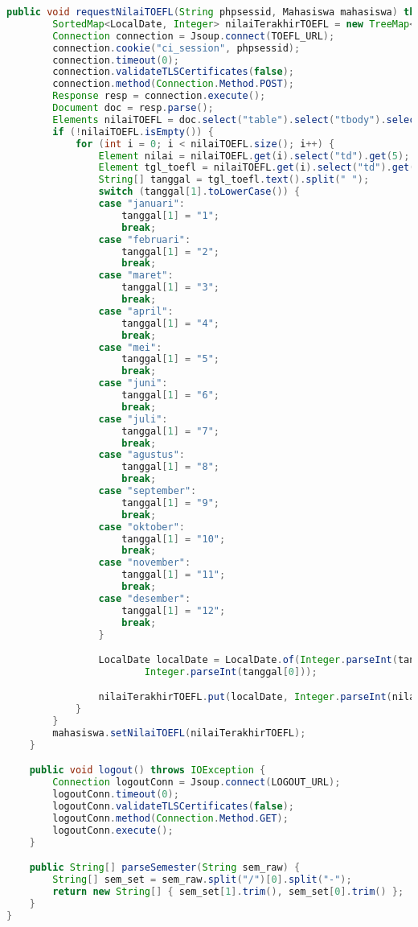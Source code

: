 \begin{lstlisting}[language=Java,basicstyle=\tiny,caption=Scraper.java]
	public void requestNilaiTOEFL(String phpsessid, Mahasiswa mahasiswa) throws IOException {
		SortedMap<LocalDate, Integer> nilaiTerakhirTOEFL = new TreeMap<>();
		Connection connection = Jsoup.connect(TOEFL_URL);
		connection.cookie("ci_session", phpsessid);
		connection.timeout(0);
		connection.validateTLSCertificates(false);
		connection.method(Connection.Method.POST);
		Response resp = connection.execute();
		Document doc = resp.parse();
		Elements nilaiTOEFL = doc.select("table").select("tbody").select("tr");
		if (!nilaiTOEFL.isEmpty()) {
			for (int i = 0; i < nilaiTOEFL.size(); i++) {
				Element nilai = nilaiTOEFL.get(i).select("td").get(5);
				Element tgl_toefl = nilaiTOEFL.get(i).select("td").get(1);
				String[] tanggal = tgl_toefl.text().split(" ");
				switch (tanggal[1].toLowerCase()) {
				case "januari":
					tanggal[1] = "1";
					break;
				case "februari":
					tanggal[1] = "2";
					break;
				case "maret":
					tanggal[1] = "3";
					break;
				case "april":
					tanggal[1] = "4";
					break;
				case "mei":
					tanggal[1] = "5";
					break;
				case "juni":
					tanggal[1] = "6";
					break;
				case "juli":
					tanggal[1] = "7";
					break;
				case "agustus":
					tanggal[1] = "8";
					break;
				case "september":
					tanggal[1] = "9";
					break;
				case "oktober":
					tanggal[1] = "10";
					break;
				case "november":
					tanggal[1] = "11";
					break;
				case "desember":
					tanggal[1] = "12";
					break;
				}

				LocalDate localDate = LocalDate.of(Integer.parseInt(tanggal[2]), Integer.parseInt(tanggal[1]),
						Integer.parseInt(tanggal[0]));

				nilaiTerakhirTOEFL.put(localDate, Integer.parseInt(nilai.text()));
			}
		}
		mahasiswa.setNilaiTOEFL(nilaiTerakhirTOEFL);
	}

	public void logout() throws IOException {
		Connection logoutConn = Jsoup.connect(LOGOUT_URL);
		logoutConn.timeout(0);
		logoutConn.validateTLSCertificates(false);
		logoutConn.method(Connection.Method.GET);
		logoutConn.execute();
	}

	public String[] parseSemester(String sem_raw) {
		String[] sem_set = sem_raw.split("/")[0].split("-");
		return new String[] { sem_set[1].trim(), sem_set[0].trim() };
	}
}
\end{lstlisting}

